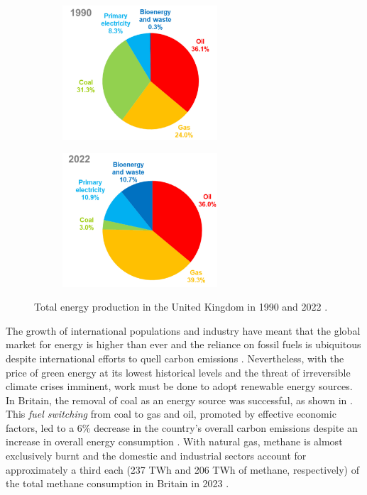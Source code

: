 \begin{figure}[t]
\centering
    \begin{subfigure}{0.40\textwidth}
    \centering
    \includegraphics[height=5cm]{assets/graphs/energy-consumption_1990.png}
    \end{subfigure}
    \begin{subfigure}{0.40\textwidth}
    \centering
    \includegraphics[height=5cm]{assets/graphs/energy-consumption_2022.png}
    \end{subfigure}
\caption{Total energy production in the United Kingdom in 1990 and 2022 \cite{departmentforenergysecurityandnetzero2023UKEnergyBrief}.}
\label{fig:fuel-consump}
\end{figure}

The growth of international populations and industry have meant that the global market for energy is higher than ever \cite{newell2019GlobalEnergyOutlook} and the reliance on fossil fuels is ubiquitous despite international efforts to quell carbon emissions \cite{unitednations2015ParisAgreementUNFCCC}. Nevertheless, with the price of green energy at its lowest historical levels \cite{internationalrenewableenergyagency2022RenewablePowerGeneration} and the threat of irreversible climate crises imminent, work must be done to adopt renewable energy sources. In Britain, the removal of coal as an energy source was successful, as shown in . This \emph{fuel switching} from coal to gas and oil, promoted by effective economic factors, led to a 6\% decrease in the country's overall carbon emissions despite an increase in overall energy consumption \cite{wilson2018RapidFuelSwitching}. With natural gas, methane is almost exclusively burnt and the domestic and industrial sectors account for approximately a third each (237 TWh and 206 TWh of methane, respectively) of the total methane consumption in Britain in 2023 \cite{departmentforenergysecurityandnetzero2023HistoricalGasData}.

